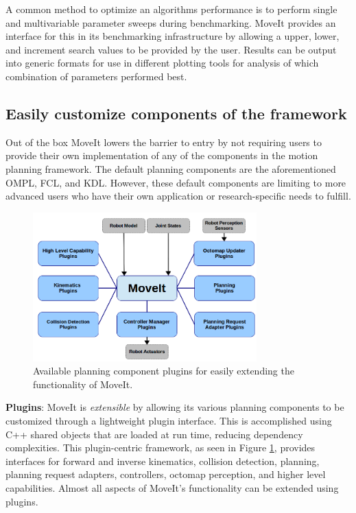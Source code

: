 \documentclass[10pt,journal,compsoc]{joser1}
\begin{document}
{A common method to optimize an algorithms performance is to perform single and multivariable parameter sweeps during benchmarking. MoveIt provides an interface for this in its benchmarking infrastructure by allowing a upper, lower, and increment search values to be provided by the user. Results can be output into generic formats for use in different plotting tools for analysis of which combination of parameters performed best.

\subsection{Easily customize components of the framework}

Out of the box MoveIt lowers the barrier to entry by not requiring users to provide their own implementation of any of the components in the motion planning framework. The default planning components are the aforementioned OMPL, FCL, and KDL. However, these default components are limiting to more advanced users who have their own application or research-specific needs to fulfill. 

\begin{figure}[!t]
\centering
\includegraphics[width=3.4in]{images/moveit_plugins}
\caption{Available planning component plugins for easily extending the functionality of MoveIt.}
\label{fig:moveit_plugins}
\end{figure}

{\bf Plugins}: MoveIt is \textit{extensible} by allowing its various planning components to be customized through a lightweight plugin interface. This is accomplished using C++ shared objects that are loaded at run time, reducing dependency complexities. This plugin-centric framework, as seen in Figure \ref{fig:moveit_plugins}, provides interfaces for forward and inverse kinematics, collision detection, planning, planning request adapters, controllers, octomap perception, and higher level capabilities. Almost all aspects of MoveIt's functionality can be extended using plugins.

}
\end{document}
